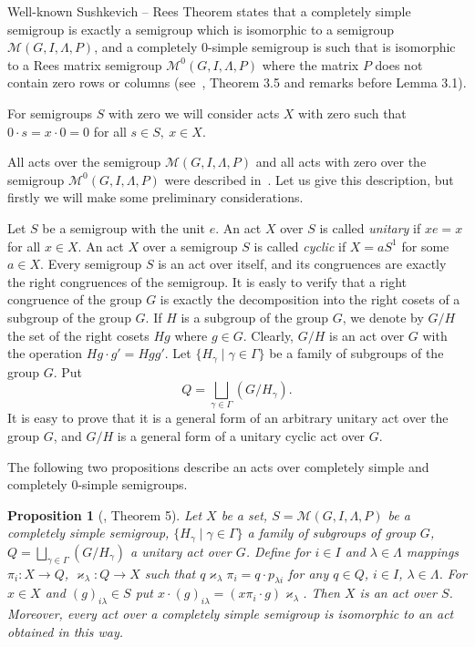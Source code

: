 \documentclass{birkau}
\numberwithin{equation}{section}
\theoremstyle{plain}
\newtheorem{proposition}[theorem]{Proposition}
\theoremstyle{definition}
\begin{document}
	Well-known Sushkevich -- Rees Theorem states that a completely simple semigroup is exactly a semigroup which is isomorphic to a semigroup $\mathcal{M}(G, I,\Lambda,P)$, and a completely 0-simple semigroup is such that is isomorphic to a Rees matrix semigroup $\mathcal{M}^0(G,I,\Lambda,P)$ where the matrix $P$ does not contain zero rows or columns (see~\cite{cliff}, Theorem 3.5 and remarks before Lemma 3.1).
	
	For semigroups $S$ with zero we will consider acts $X$ with zero such that $0 \cdot s = x \cdot 0 = 0$ for all $s\in S,\ x\in X$.
	
	All acts over the semigroup $\mathcal{M}(G,I,\Lambda,P)$ and all acts with zero over the semigroup $\mathcal{M}^0(G,I,\Lambda,P)$ were described in~\cite{avdeev}. Let us give this description, but firstly we will make some preliminary considerations.
	
	Let $S$ be a semigroup with the unit $e$. An act $X$ over $S$ is called \textit{unitary} if $xe=x$ for all $x \in X$. An act $X$ over a semigroup $S$ is called \textit{cyclic} if $X=aS^1$ for some $a \in X$. Every semigroup $S$ is an act over itself, and its congruences are exactly the right congruences of the semigroup. It is easly to verify that a right congruence of the group $G$ is exactly the decomposition into the right cosets of a subgroup of the group $G$. If $H$ is a subgroup of the group $G$, we denote by $G/H$ the set of the right cosets $Hg$ where $g \in G$. Clearly, $G/H$ is an act over $G$ with the operation $Hg \cdot g' = Hgg'$. Let $\{ H_\gamma \mid \gamma \in \Gamma \} $ be a family of subgroups of the group $G$. Put $$ Q = \bigsqcup_{\gamma \in \Gamma} (G/H_\gamma). $$ It is easy to prove that it is a general form of an arbitrary unitary act over the group $G$, and $G/H$ is a general form of a unitary cyclic act over $G$.
	
	The following two propositions describe an acts over completely simple and completely 0-simple semigroups.
	
	\begin{proposition}[\cite{avdeev}, Theorem 5] \label{pr01}
	    Let $X$ be a set, $S=\mathcal{M}(G,I,\Lambda,P)$ be a completely simple semigroup, $\{ H_\gamma \mid \gamma \in \Gamma \}$ a family of subgroups of group $G$, $ Q = \bigsqcup_{\gamma \in \Gamma} (G/H_\gamma) $ a unitary act over $G$. Define for $ i \in I$ and $\lambda \in \Lambda$  mappings $\pi_i:X \rightarrow Q$, $\varkappa_\lambda: Q \rightarrow X$ such that $q \varkappa_\lambda \pi_i = q \cdot p_{\lambda i}$ for any $q \in Q$, $i \in I$, $\lambda \in \Lambda$. For $x \in X$ and $(g)_{i \lambda} \in S$ put $x \cdot (g)_{i \lambda} = (x \pi_i \cdot g)\varkappa_{\lambda}$. Then $X$ is an act over $S$. Moreover, every act over a completely simple semigroup is isomorphic to an act obtained in this way.
	\end{proposition}
	
\end{document}
